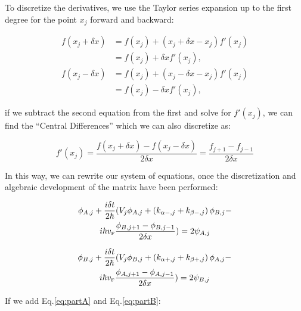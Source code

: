 To discretize the derivatives, we use the Taylor series expansion up to the first degree for the point $x_j$ forward and backward:

\begin{align}
    \label{eq:TaylorBeforeAndAfter}
    f(x_j+\delta x)&=f(x_j) + (x_j+\delta x-x_j)f'(x_j)\nonumber\\
    &=f(x_j)+\delta xf'(x_j),\nonumber\\
    f(x_j-\delta x)&=f(x_j) + (x_j-\delta x-x_j)f'(x_j)\nonumber\\
    &=f(x_j)-\delta xf'(x_j),
\end{align}

\noindent if we subtract the second equation from the first and solve for $f'(x_j)$, we can find the ``Central Differences'' which we can also discretize as:

\begin{equation}
    \label{eq:diferenciasCentradas}
    f'(x_j)=\frac{f(x_j+\delta x)-f(x_j-\delta x)}{2\delta x} = \frac{f_{j+1}-f_{j-1}}{2\delta x}
\end{equation}

In this way, we can rewrite our system of equations, once the discretization and algebraic development of the matrix have been performed:

\begin{multline}
    \label{eq:partA}
    \phi_{A, j} + \frac{i\delta t}{2\hbar}(V_j\phi_{A,j} + \left(k_{\alpha-,j}+k_{\beta-,j}\right)\phi_{B,j}-\\
    i\hbar v_{\mbox{\tiny F}}\frac{\phi_{B, j+1}-\phi_{B, j-1}}{2\delta x}) = 2\psi_{A,j}
\end{multline}

\begin{multline}
    \label{eq:partB}
    \phi_{B, j} + \frac{i\delta t}{2\hbar}(V_j\phi_{B,j} + \left(k_{\alpha+,j}+k_{\beta+,j}\right)\phi_{A,j}-\\
    i\hbar v_{\mbox{\tiny F}}\frac{\phi_{A, j+1}-\phi_{A, j-1}}{2\delta x}) = 2\psi_{B,j}
\end{multline}

If we add Eq.\eqref{eq:partA} and Eq.\eqref{eq:partB}:



